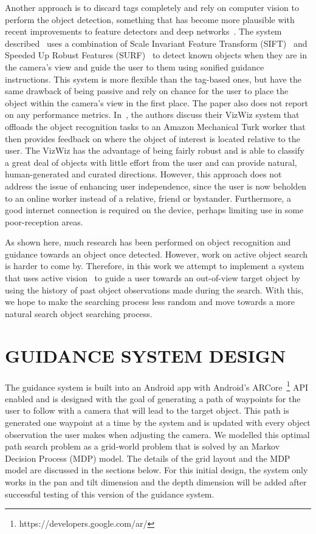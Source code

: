 \documentclass[a4paper, twoside]{article}
\begin{document}
Another approach is to discard tags completely and rely on computer vision to perform the object detection, something that has become more plausible with recent improvements to feature detectors and deep networks~\cite{huang2017speed,redmon2016you}. The system described~\cite{schauerte2012assistive} uses a combination of Scale Invariant Feature Transform (SIFT)~\cite{lowe1999object} and Speeded Up Robust Features (SURF)~\cite{bay2006surf} to detect known objects when they are in the camera's view and guide the user to them using sonified guidance instructions. This system is more flexible than the tag-based ones, but have the same drawback of being passive and rely on chance for the user to place the object within the camera's view in the first place. The paper also does not report on any performance metrics. In~\cite{bigham2010vizwiz}, the authors discuss their VizWiz system that offloads the object recognition tasks to an Amazon Mechanical Turk worker that then provides feedback on where the object of interest is located relative to the user. The VizWiz has the advantage of being fairly robust and is able to classify a great deal of objects with little effort from the user and can provide natural, human-generated and curated directions. However, this approach does not address the issue of enhancing user independence, since the user is now beholden to an online worker instead of a relative, friend or bystander. Furthermore, a good internet connection is required on the device, perhaps limiting use in some poor-reception areas.

As shown here, much research has been performed on object recognition and guidance towards an object once detected. However, work on active object search is harder to come by. Therefore, in this work we attempt to implement a system that uses active vision~\cite{aloimonos1988active} to guide a user towards an out-of-view target object by using the history of past object observations made during the search. With this, we hope to make the searching process less random and move towards a more natural search object searching process. 

\section{\uppercase{Guidance System Design}}

\noindent The guidance system is built into an Android app with Android's ARCore~\footnote{https://developers.google.com/ar/} API enabled and is designed with the goal of generating a path of waypoints for the user to follow with a camera that will lead to the target object. This path is generated one waypoint at a time by the system and is updated with every object observation the user makes when adjusting the camera. We modelled this optimal path search problem as a grid-world problem that is solved by an Markov Decision Process (MDP) model. The details of the grid layout and the MDP model are discussed in the sections below. For this initial design, the system only works in the pan and tilt dimension and the depth dimension will be added after successful testing of this version of the guidance system.
\end{document}
